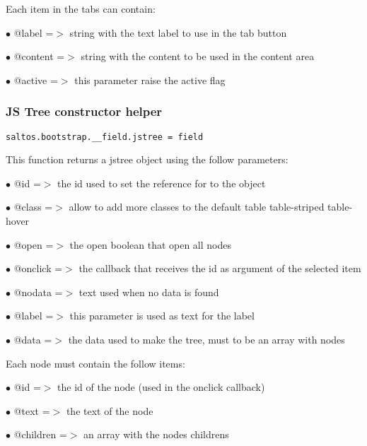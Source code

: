 \documentclass[a4paper]{article}
\begin{document}
Each item in the tabs can contain:

\begin{compactitem}
\item[\color{myblue}$\bullet$] @label    =$>$ string with the text label to use in the tab button
\item[\color{myblue}$\bullet$] @content  =$>$ string with the content to be used in the content area
\item[\color{myblue}$\bullet$] @active   =$>$ this parameter raise the active flag
\end{compactitem}

\hypertarget{toc649}{}
\subsubsection{JS Tree constructor helper}

\begin{lstlisting}
saltos.bootstrap.__field.jstree = field
\end{lstlisting}

This function returns a jstree object using the follow parameters:

\begin{compactitem}
\item[\color{myblue}$\bullet$] @id      =$>$ the id used to set the reference for to the object
\item[\color{myblue}$\bullet$] @class    =$>$ allow to add more classes to the default table table-striped table-hover
\item[\color{myblue}$\bullet$] @open    =$>$ the open boolean that open all nodes
\item[\color{myblue}$\bullet$] @onclick =$>$ the callback that receives the id as argument of the selected item
\item[\color{myblue}$\bullet$] @nodata   =$>$ text used when no data is found
\item[\color{myblue}$\bullet$] @label    =$>$ this parameter is used as text for the label
\item[\color{myblue}$\bullet$] @data    =$>$ the data used to make the tree, must to be an array with nodes
\end{compactitem}

Each node must contain the follow items:

\begin{compactitem}
\item[\color{myblue}$\bullet$] @id       =$>$ the id of the node (used in the onclick callback)
\item[\color{myblue}$\bullet$] @text     =$>$ the text of the node
\item[\color{myblue}$\bullet$] @children =$>$ an array with the nodes childrens
\end{compactitem}
\end{document}
